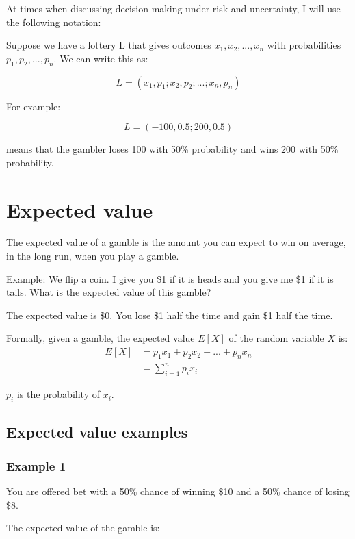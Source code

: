 \documentclass[
  letterpaper,
  DIV=11,
  numbers=noendperiod]{scrreprt}
\begin{document}
At times when discussing decision making under risk and uncertainty, I
will use the following notation:

Suppose we have a lottery L that gives outcomes \(x_1, x_2, ..., x_n\)
with probabilities \(p_1, p_2, ..., p_n\). We can write this as:

\[L=(x_1,p_1; x_2,p_2; ...; x_n,p_n)\]

For example:

\[L=(−100, 0.5; 200, 0.5)\]

means that the gambler loses 100 with 50\% probability and wins 200 with
50\% probability.

\hypertarget{expected-value}{%
\chapter{Expected value}\label{expected-value}}

The expected value of a gamble is the amount you can expect to win on
average, in the long run, when you play a gamble.

Example: We flip a coin. I give you \$1 if it is heads and you give me
\$1 if it is tails. What is the expected value of this gamble?

The expected value is \$0. You lose \$1 half the time and gain \$1 half
the time.

Formally, given a gamble, the expected value \(E[X]\) of the random
variable \(X\) is:\\

\begin{align*}
E[X]&=p_1x_1+p_2x_2+...+p_nx_n \\
&=\sum_{i=1}^np_ix_i
\end{align*}

\(p_i\) is the probability of \(x_i\).

\hypertarget{expected-value-examples}{%
\section{Expected value examples}\label{expected-value-examples}}

\hypertarget{example-1}{%
\subsection{Example 1}\label{example-1}}

You are offered bet with a 50\% chance of winning \$10 and a 50\% chance
of losing \$8.

The expected value of the gamble is:
\end{document}
